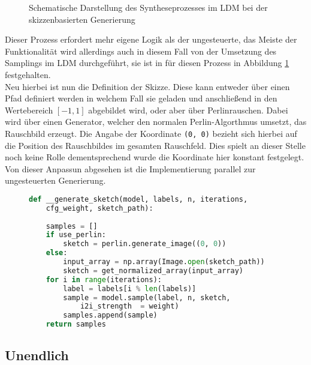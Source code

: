 \begin{figure}[htbp]
    \centering
    \caption{Schematische Darstellung des Syntheseprozesses im \ac{LDM} bei der skizzenbasierten Generierung}
    \label{fig:sketch}
\end{figure}
Dieser Prozess erfordert mehr eigene Logik als der ungesteuerte, das Meiste der Funktionalität wird allerdings auch in diesem Fall von der Umsetzung des Samplings im \ac{LDM} durchgeführt, sie ist in für diesen Prozess in Abbildung \ref{fig:sketch} festgehalten. \\
Neu hierbei ist nun die Definition der Skizze. Diese kann entweder über einen Pfad definiert werden in welchem Fall sie geladen und anschließend in den Wertebereich $[-1,1]$ abgebildet wird, oder aber über Perlinrauschen. Dabei wird über einen Generator, welcher den normalen Perlin-Algorthmus umsetzt, das Rauschbild erzeugt. Die Angabe der Koordinate \texttt{(0, 0)} bezieht sich hierbei auf die Position des Rauschbildes im gesamten Rauschfeld. Dies spielt an dieser Stelle noch keine Rolle dementsprechend wurde die Koordinate hier konstant festgelegt. Von dieser Anpassun abgesehen ist die Implementierung parallel zur ungesteuerten Generierung.
\begin{figure}[htbp]
\begin{lstlisting}[language=python]
def __generate_sketch(model, labels, n, iterations,
    cfg_weight, sketch_path):
    
    samples = []
    if use_perlin:
        sketch = perlin.generate_image((0, 0))
    else:
        input_array = np.array(Image.open(sketch_path))
        sketch = get_normalized_array(input_array)
    for i in range(iterations):
        label = labels[i % len(labels)]
        sample = model.sample(label, n, sketch,
            i2i_strength  = weight)
        samples.append(sample)
    return samples
\end{lstlisting}
    \captionsetup{type=figure}
    \label{fig:gen_sketch}
\end{figure}

\subsection {Unendlich}


